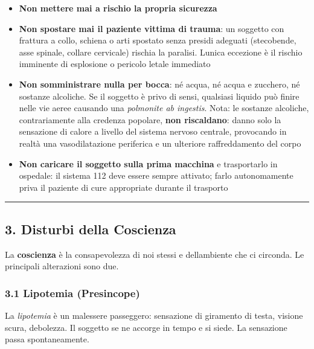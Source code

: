 \documentclass[a4paper,11pt]{article}
\providecommand{\tightlist}{%
  \setlength{\itemsep}{0pt}\setlength{\parskip}{0pt}}
\begin{document}
\begin{itemize}
      \tightlist
      \item
            \textbf{Non mettere mai a rischio la propria sicurezza}
      \item
            \textbf{Non spostare mai il paziente vittima di trauma}: un soggetto
            con frattura a collo, schiena o arti spostato senza presidi adeguati
            (stecobende, asse spinale, collare cervicale) rischia la paralisi.
            L\textquotesingle unica eccezione è il rischio imminente di esplosione
            o pericolo letale immediato
      \item
            \textbf{Non somministrare nulla per bocca}: né acqua, né acqua e
            zucchero, né sostanze alcoliche. Se il soggetto è privo di sensi,
            qualsiasi liquido può finire nelle vie aeree causando una
            \emph{polmonite ab ingestis}. Nota: le sostanze alcoliche,
            contrariamente alla credenza popolare, \textbf{non riscaldano}: danno
            solo la sensazione di calore a livello del sistema nervoso centrale,
            provocando in realtà una vasodilatazione periferica e un ulteriore
            raffreddamento del corpo
      \item
            \textbf{Non caricare il soggetto sulla prima macchina} e trasportarlo
            in ospedale: il sistema 112 deve essere sempre attivato; farlo
            autonomamente priva il paziente di cure appropriate durante il
            trasporto
\end{itemize}

\begin{center}\rule{0.5\linewidth}{0.5pt}\end{center}

\subsection{3. Disturbi della Coscienza}\label{disturbi-della-coscienza}

La \textbf{coscienza} è la consapevolezza di noi stessi e
dell\textquotesingle ambiente che ci circonda. Le principali alterazioni
sono due.

\subsubsection{3.1 Lipotemia (Presincope)}\label{lipotemia-presincope}

La \emph{lipotemia} è un malessere passeggero: sensazione di giramento
di testa, visione scura, debolezza. Il soggetto se ne accorge in tempo e
si siede. La sensazione passa spontaneamente.
\end{document}
